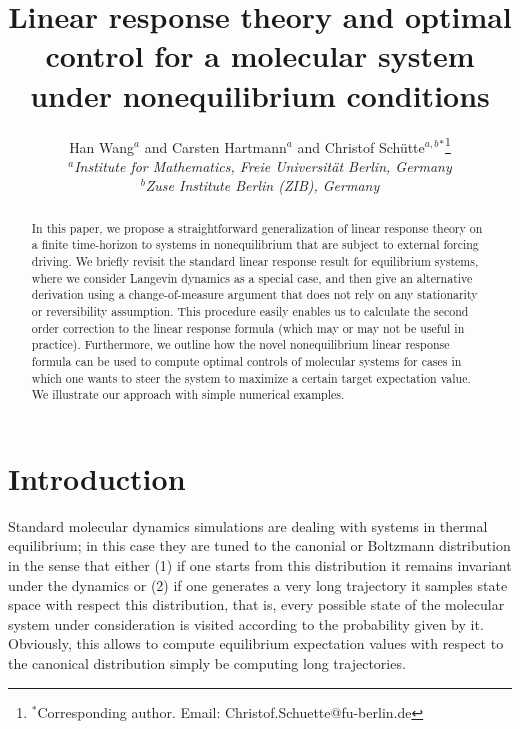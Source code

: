 \documentclass[]{tMPH2e}
\begin{document}
\title{Linear response theory and optimal control for a molecular system under nonequilibrium conditions}

\author{Han Wang$^{a}$ and Carsten Hartmann$^{a}$ and Christof Sch\"utte$^{a,b}$$^{\ast}$\thanks{$^\ast$Corresponding author. Email: Christof.Schuette@fu-berlin.de}\\\vspace{6pt}$^{a}${\em Institute for Mathematics, Freie Universit\"at Berlin, Germany}\\$^{b}${\em Zuse Institute Berlin (ZIB), Germany}}
  


\maketitle

\begin{abstract}
  In this paper, we propose a straightforward generalization of linear response theory on a finite time-horizon to systems in nonequilibrium that are subject to external forcing driving.  We briefly revisit the standard linear response result for equilibrium systems, where we consider Langevin dynamics as a special case, and then give an alternative derivation using a change-of-measure argument that does not rely on any stationarity or reversibility assumption. This procedure easily enables us to calculate the second order correction to the linear response formula (which may or may not be useful in practice). Furthermore, we outline how the novel nonequilibrium linear response formula can be used to compute optimal controls of molecular systems for cases in which one wants to steer the system to maximize a certain target expectation value. We illustrate our approach with simple numerical examples. 
\end{abstract}


\section{Introduction}

Standard molecular dynamics simulations are dealing with systems in thermal equilibrium; in this case they are tuned to the canonial or Boltzmann distribution in the sense that either (1) if one starts from this distribution it remains invariant under the dynamics or (2) if one generates a very long trajectory it samples state space with respect this distribution, that is, every possible state of the molecular system under consideration is visited according to the probability given by it.  Obviously, this allows to compute equilibrium expectation values with respect to the  canonical distribution simply be computing long trajectories. 
\end{document}
